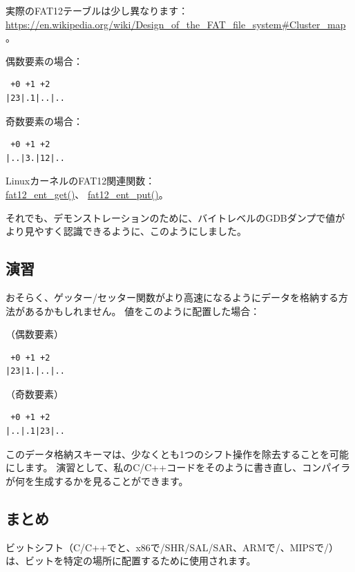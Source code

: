 実際のFAT12テーブルは少し異なります：\url{https://en.wikipedia.org/wiki/Design_of_the_FAT_file_system\#Cluster_map}。

偶数要素の場合：

\begin{lstlisting}
 +0 +1 +2
|23|.1|..|..
\end{lstlisting}

奇数要素の場合：

\begin{lstlisting}
 +0 +1 +2
|..|3.|12|..
\end{lstlisting}

LinuxカーネルのFAT12関連関数：\\
\href{https://github.com/torvalds/linux/blob/de182468d1bb726198abaab315820542425270b7/fs/fat/fatent.c#L117}{fat12\_ent\_get()}、
\href{https://github.com/torvalds/linux/blob/de182468d1bb726198abaab315820542425270b7/fs/fat/fatent.c#L153}{fat12\_ent\_put()}。

それでも、デモンストレーションのために、バイトレベルのGDBダンプで値がより見やすく認識できるように、このようにしました。

\subsection{演習}

おそらく、ゲッター/セッター関数がより高速になるようにデータを格納する方法があるかもしれません。
値をこのように配置した場合：

（偶数要素）

\begin{lstlisting}
 +0 +1 +2
|23|1.|..|..
\end{lstlisting}

（奇数要素）

\begin{lstlisting}
 +0 +1 +2
|..|.1|23|..
\end{lstlisting}

このデータ格納スキーマは、少なくとも1つのシフト操作を除去することを可能にします。
演習として、私のC/C++コードをそのように書き直し、コンパイラが何を生成するかを見ることができます。

\subsection{まとめ}

ビットシフト（C/C++で\TT{<<}と\TT{>>}、x86で/{SHR}/{SAL}/{SAR}、ARMで/、MIPSで/）は、ビットを特定の場所に配置するために使用されます。

